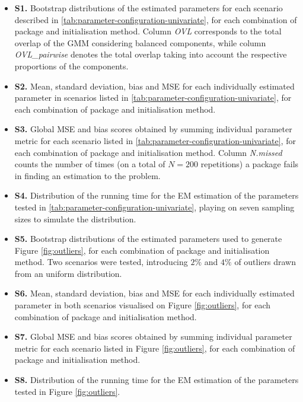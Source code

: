 \begin{itemize}
\tightlist
\item
  \textbf{S1.} Bootstrap distributions of the estimated parameters for each
  scenario described in
  \ref{tab:parameter-configuration-univariate}, for each
  combination of package and initialisation method. Column \emph{OVL}
  corresponds to the total overlap of the GMM considering balanced
  components, while column \emph{OVL\_pairwise} denotes the total overlap
  taking into account the respective proportions of the components.
\item
  \textbf{S2.} Mean, standard deviation, bias and MSE for each individually
  estimated parameter in scenarios listed in
  \ref{tab:parameter-configuration-univariate}, for each
  combination of package and initialisation method.
\item
  \textbf{S3.} Global MSE and bias scores obtained by summing individual
  parameter metric for each scenario listed in
  \ref{tab:parameter-configuration-univariate}, for each
  combination of package and initialisation method. Column \emph{N.missed}
  counts the number of times (on a total of \(N=200\) repetitions) a
  package fails in finding an estimation to the problem.
\item
  \textbf{S4.} Distribution of the running time for the EM estimation of
  the parameters tested in
  \ref{tab:parameter-configuration-univariate}, playing on seven
  sampling sizes to simulate the distribution.
\item
  \textbf{S5.} Bootstrap distributions of the estimated parameters used to
  generate Figure \ref{fig:outliers}, for each combination of package
  and initialisation method. Two scenarios were tested, introducing
  \(2 \%\) and \(4 \%\) of outliers drawn from an uniform distribution.
\item
  \textbf{S6.} Mean, standard deviation, bias and MSE for each individually
  estimated parameter in both scenarios visualised on Figure
  \ref{fig:outliers}, for each combination of package and
  initialisation method.
\item
  \textbf{S7.} Global MSE and bias scores obtained by summing individual
  parameter metric for each scenario listed in Figure
  \ref{fig:outliers}, for each combination of package and
  initialisation method.
\item
  \textbf{S8.} Distribution of the running time for the EM estimation of
  the parameters tested in Figure \ref{fig:outliers}.
\end{itemize}

